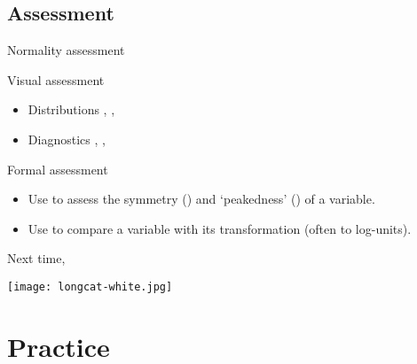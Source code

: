 \documentclass[t]{beamer}
\begin{document}
	\subsection{Assessment}
	
	\begin{frame}[t]{Normality assessment}
		
	\begin{block}{Visual assessment}
	
		\begin{itemize}
			\item Distributions \hfill %
				, , 
			\item Diagnostics \hfill %
				, , 
		\end{itemize}

	\end{block}

	\begin{block}{Formal assessment}
	
		\begin{itemize}
			\item Use  to assess the symmetry %
			  () %
				and `peakedness' () of a variable.
			\item Use  %
				to compare a variable with its transformation (often to log-units).
		\end{itemize}

	\end{block}
		
	\end{frame}

	\begin{frame}[t,plain]
		
		\vspace{.3\paperwidth}
		\begin{center}
			{\Large Next time, }\\
		\end{center}
		
		\vspace{1em}
		\begin{flushright}
			\texttt{[image: longcat-white.jpg]}		
		\end{flushright}

	\end{frame}
	
	\section{Practice}
\end{document}
